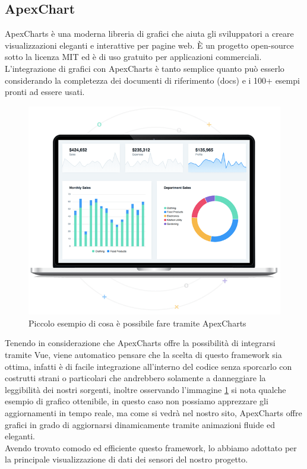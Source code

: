 \documentclass{article}
\begin{document}
\subsection{ApexChart}
ApexCharts\cite{apexcharts} è una moderna libreria di grafici che aiuta gli sviluppatori a creare visualizzazioni eleganti e interattive per pagine web. È un progetto open-source sotto la licenza MIT ed è di uso gratuito per applicazioni commerciali.\\
L'integrazione di grafici con ApexCharts è tanto semplice quanto può esserlo considerando la completezza dei documenti di riferimento (docs) e i 100+ esempi pronti ad essere usati.\\
\begin{figure}[h!]
	\centering
	\includegraphics[scale=0.7]{apexchart.png}
	\caption{Piccolo esempio di cosa è possibile fare tramite ApexCharts}
	\label{fig:apexchart}
\end{figure}
Tenendo in considerazione che ApexCharts offre la possibilità di integrarsi tramite Vue, viene automatico pensare che la scelta di questo framework sia ottima, infatti è di facile integrazione all'interno del codice senza sporcarlo con costrutti strani o particolari che andrebbero solamente a danneggiare la leggibilità dei nostri sorgenti, inoltre osservando l'immagine \ref{fig:apexchart} si nota qualche esempio di grafico ottenibile, in questo caso non possiamo apprezzare gli aggiornamenti in tempo reale, ma come si vedrà nel nostro sito, ApexCharts offre grafici in grado di aggiornarsi dinamicamente tramite animazioni fluide ed eleganti.\\
Avendo trovato comodo ed efficiente questo framework, lo abbiamo adottato per la principale visualizzazione di dati dei sensori del nostro progetto.
\end{document}
